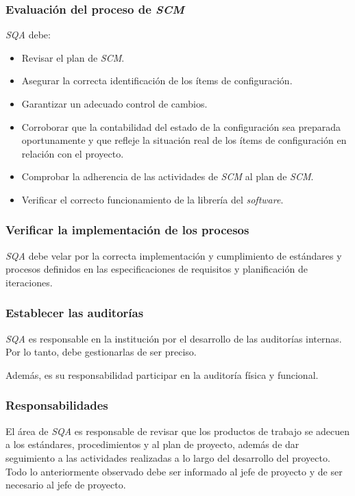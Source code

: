 \subsubsection{Evaluación del proceso de \textit{SCM}}

\textit{SQA} debe:

\begin{itemize}
		\item 
		Revisar el plan de \textit{SCM}.
		\item 
		Asegurar la correcta identificación de los ítems de configuración.
		\item 
		Garantizar un adecuado control de cambios.
		\item 
		Corroborar que la contabilidad del estado de la configuración sea preparada oportunamente y que refleje la situación real de los ítems de configuración en relación con el proyecto.
		\item 
		Comprobar la adherencia de las actividades de \textit{SCM} al plan de \textit{SCM}.
		\item 
		Verificar el correcto funcionamiento de la librería del \textit{software}.
	\end{itemize}

\subsubsection{Verificar la implementación de los procesos}

\textit{SQA} debe velar por la correcta implementación y cumplimiento de estándares y procesos definidos en las especificaciones de requisitos y planificación de iteraciones.

\subsubsection{Establecer las auditorías}

\textit{SQA} es responsable en la institución por el desarrollo de las auditorías internas. Por lo tanto, debe gestionarlas de ser preciso.

Además, es su responsabilidad participar en la auditoría física y funcional.

\subsubsection{Responsabilidades}

El área de \textit{SQA} es responsable de revisar que los productos de trabajo se adecuen a los estándares, procedimientos y al plan de proyecto, además de dar seguimiento a las actividades realizadas a lo largo del desarrollo del proyecto. Todo lo anteriormente observado debe ser informado al jefe de proyecto y de ser necesario al jefe de proyecto.

